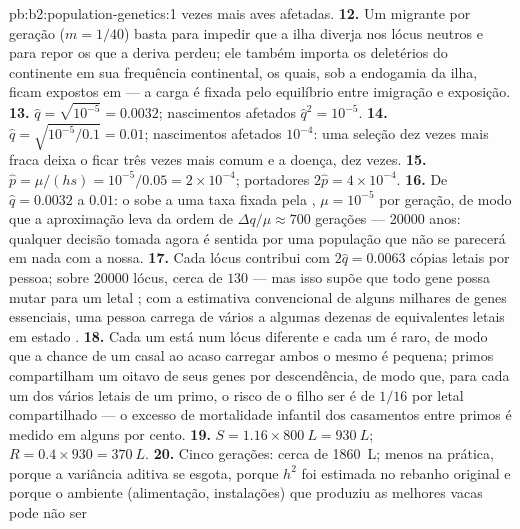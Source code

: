 \begin{solution}{pb:b2:population-genetics:1}
vezes mais aves afetadas.
\textbf{12.} Um migrante por geração ($m = 1/40$) basta para impedir
que a ilha diverja nos lócus neutros e para repor os  que a deriva
perdeu; ele também importa os  deletérios do continente em sua
frequência continental, os quais, sob a endogamia da ilha, ficam
expostos em  --- a carga é fixada pelo equilíbrio entre
imigração e exposição.
\textbf{13.} $\hat q = \sqrt{10^{-5}} = 0.0032$; nascimentos afetados $\hat
q^{2} = 10^{-5}$.
\textbf{14.} $\hat q = \sqrt{10^{-5}/0.1} = 0.01$; nascimentos afetados
$10^{-4}$: uma seleção dez vezes mais fraca deixa o  ficar três
vezes mais comum e a doença, dez vezes.
\textbf{15.} $\hat p = \mu/(hs) = 10^{-5}/0.05 = 2\times 10^{-4}$;
portadores $2\hat p = 4\times 10^{-4}$.
\textbf{16.} De $\hat q = 0.0032$ a $0.01$: o  sobe a uma taxa
fixada pela , $\mu = 10^{-5}$ por geração, de modo que a
aproximação leva da ordem de $\Delta q/\mu \approx 700$ gerações ---
\num{20000} anos: qualquer decisão tomada agora é sentida por uma
população que não se parecerá em nada com a nossa.
\textbf{17.} Cada lócus contribui com $2\hat q = 0.0063$ cópias letais
por pessoa; sobre \num{20000} lócus, cerca de $130$ --- mas isso supõe
que todo gene possa mutar para um letal ; com a estimativa
convencional de alguns milhares de genes essenciais, uma pessoa carrega
de vários a algumas dezenas de equivalentes letais em estado .
\textbf{18.} Cada um está num lócus diferente e cada um é raro, de modo
que a chance de um casal ao acaso carregar ambos o mesmo é pequena; primos
compartilham um oitavo de seus genes por descendência, de modo que, para
cada um dos vários letais de um primo, o risco de o filho ser  é
de $1/16$ por letal compartilhado --- o excesso de mortalidade infantil
dos casamentos entre primos é medido em alguns por cento.
\textbf{19.} $S = 1.16\times \qty{800}{L} = \qty{930}{L}$; $R = 0.4\times
930 = \qty{370}{L}$.
\textbf{20.} Cinco gerações: cerca de \qty{1860}{L}; menos na
prática, porque a variância aditiva se esgota, porque $h^{2}$
foi estimada no rebanho original e porque o ambiente
(alimentação, instalações) que produziu as melhores vacas pode não ser

\end{solution}
